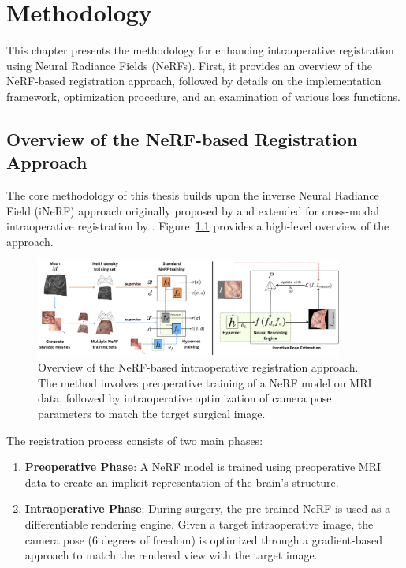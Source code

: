 \chapter{Methodology}\label{chapter:methodology}

This chapter presents the methodology for enhancing intraoperative registration using Neural Radiance Fields (NeRFs). First, it provides an overview of the NeRF-based registration approach, followed by details on the implementation framework, optimization procedure, and an examination of various loss functions.

\section{Overview of the NeRF-based Registration Approach}

The core methodology of this thesis builds upon the inverse Neural Radiance Field (iNeRF) approach originally proposed by \textcite{yen2020inerf} and extended for cross-modal intraoperative registration by \textcite{fehrentz2024intraoperative}. Figure~\ref{fig:overview} provides a high-level overview of the approach.


\vspace{1cm}
\begin{figure}[htbp]
  \centering
  \includegraphics[width=0.9\textwidth]{figures/pipeline.jpg}
  \caption{Overview of the NeRF-based intraoperative registration approach. The method involves preoperative training of a NeRF model on MRI data, followed by intraoperative optimization of camera pose parameters to match the target surgical image.\parencite{fehrentz2024intraoperative}}
  \label{fig:overview}
\end{figure}

\vspace{1cm}

The registration process consists of two main phases:

\begin{enumerate}
    \item \textbf{Preoperative Phase}: A NeRF model is trained using preoperative MRI data to create an implicit representation of the brain's structure.
    
    \item \textbf{Intraoperative Phase}: During surgery, the pre-trained NeRF is used as a differentiable rendering engine. Given a target intraoperative image, the camera pose (6 degrees of freedom) is optimized through a gradient-based approach to match the rendered view with the target image.
\end{enumerate}

